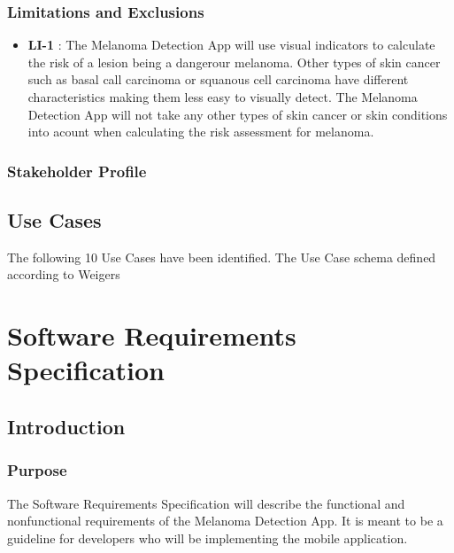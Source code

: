    \subsubsection{Limitations and Exclusions}

        \noindent
        \begin{itemize}[leftmargin=*]
            \item[]  \textbf{LI-1} : The Melanoma Detection App will use visual indicators to calculate the risk of a lesion being a dangerour melanoma. Other types of skin cancer such as basal call carcinoma or squanous cell carcinoma have different characteristics making them less easy to visually detect. The Melanoma Detection App will not take any other types of skin cancer or skin conditions into acount when calculating the risk assessment for melanoma.

        \end{itemize}

    \subsubsection{Stakeholder Profile}



    \subsection{Use Cases}

        The following 10 Use Cases have been identified. The Use Case schema defined according to Weigers

        


\section{Software Requirements Specification}

    \subsection{Introduction}
        \subsubsection{Purpose}

            The Software Requirements Specification will describe the functional and nonfunctional requirements of the Melanoma Detection App. It is meant to be a guideline for developers who will be implementing the mobile application.

